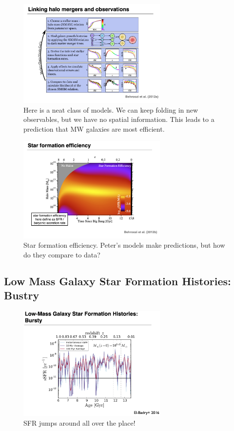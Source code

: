 \documentclass{article}
\begin{document}
\begin{figure}
    \centering
    \includegraphics[width=0.66\textwidth]{figs/Screen Shot 2021-11-19 at 10.39.30 AM.png}
    \caption{Here is a neat class of models. We can keep folding in new observables, but we have no spatial information. This leads to a prediction that MW galaxies are most efficient. }
    \label{fig:ammmmm}
\end{figure}

\begin{figure}
    \centering
    \includegraphics[width=0.66\textwidth]{figs/Screen Shot 2021-11-19 at 10.43.36 AM.png}
    \caption{Star formation efficiency. Peter's models make predictions, but how do they compare to data?}
    \label{fig:starFORMATIONHALOEFFICIENCY}
\end{figure}

\subsection{Low Mass Galaxy Star Formation Histories: Bustry}

\begin{figure}
    \centering
    \includegraphics[width=0.66\textwidth]{figs/Screen Shot 2021-11-19 at 10.51.23 AM.png}
    \caption{SFR jumps around all over the place!}
    \label{fig:kareem_paper}
\end{figure}
\end{document}
